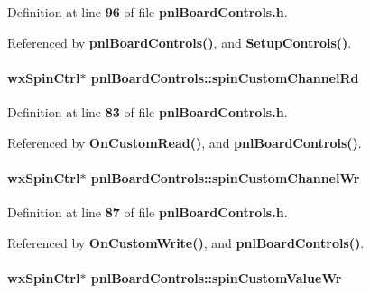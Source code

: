 Definition at line {\bf 96} of file {\bf pnl\+Board\+Controls.\+h}.



Referenced by {\bf pnl\+Board\+Controls()}, and {\bf Setup\+Controls()}.

\paragraph[{spin\+Custom\+Channel\+Rd}]{\setlength{\rightskip}{0pt plus 5cm}wx\+Spin\+Ctrl$\ast$ pnl\+Board\+Controls\+::spin\+Custom\+Channel\+Rd\hspace{0.3cm}{\ttfamily [protected]}}\label{classpnlBoardControls_a445e7cca9d66055c9bd1e3ff6b4b4162}


Definition at line {\bf 83} of file {\bf pnl\+Board\+Controls.\+h}.



Referenced by {\bf On\+Custom\+Read()}, and {\bf pnl\+Board\+Controls()}.

\paragraph[{spin\+Custom\+Channel\+Wr}]{\setlength{\rightskip}{0pt plus 5cm}wx\+Spin\+Ctrl$\ast$ pnl\+Board\+Controls\+::spin\+Custom\+Channel\+Wr\hspace{0.3cm}{\ttfamily [protected]}}\label{classpnlBoardControls_af02414a3819946da540933392e834579}


Definition at line {\bf 87} of file {\bf pnl\+Board\+Controls.\+h}.



Referenced by {\bf On\+Custom\+Write()}, and {\bf pnl\+Board\+Controls()}.

\paragraph[{spin\+Custom\+Value\+Wr}]{\setlength{\rightskip}{0pt plus 5cm}wx\+Spin\+Ctrl$\ast$ pnl\+Board\+Controls\+::spin\+Custom\+Value\+Wr\hspace{0.3cm}{\ttfamily [protected]}}\label{classpnlBoardControls_a57117cea44400665933d6e981ddab324}


